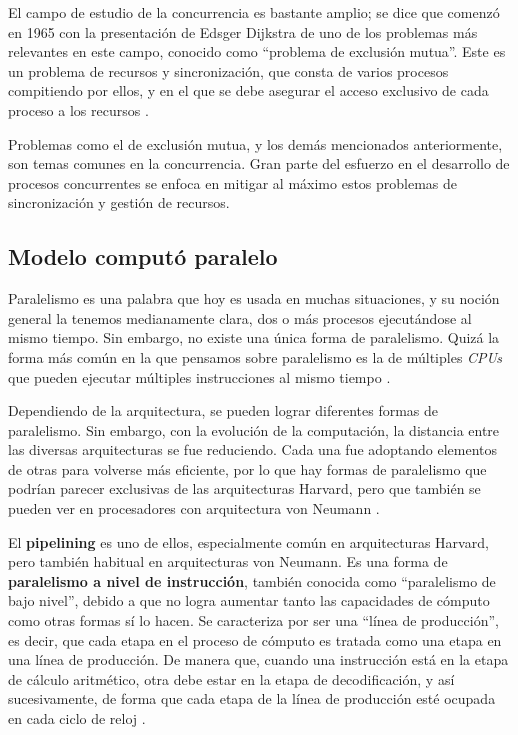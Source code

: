 \documentclass[letterpaper,12pt,oneside]{book}
\begin{document}
		El campo de estudio de la concurrencia es bastante amplio; se dice que comenzó en 1965 con la presentación de Edsger Dijkstra de uno
		de los problemas más relevantes en este campo, conocido como ``problema de exclusión mutua''. Este es un 
		problema de recursos y sincronización, que consta de varios procesos compitiendo por ellos, y en el que se debe asegurar el acceso exclusivo de
		cada proceso a los recursos \cite{gadi_taubenfeld_concurrent_nodate}. 
  
        Problemas como el de exclusión mutua, y los demás mencionados anteriormente,
		son temas comunes en la concurrencia. Gran parte del esfuerzo en el desarrollo de procesos concurrentes se enfoca en mitigar al máximo estos problemas de sincronización y gestión de recursos.
		
		
		
		\subsection{Modelo computó paralelo}

		Paralelismo es una palabra que hoy es usada en muchas situaciones, y su noción general la tenemos medianamente clara, dos o más procesos
		ejecutándose al mismo tiempo. Sin embargo, no existe una única forma de paralelismo. Quizá la forma más común en la que pensamos sobre paralelismo
		es la de múltiples \textit{CPUs} que pueden ejecutar múltiples instrucciones al mismo tiempo \cite{null_essentials_2003}.
  
        Dependiendo de la arquitectura, se pueden lograr diferentes formas de paralelismo. Sin embargo,
		con la evolución de la computación, la distancia entre las diversas arquitecturas se fue reduciendo. Cada una fue adoptando
		elementos de otras para volverse más eficiente, por lo que hay formas de paralelismo que podrían parecer exclusivas de las arquitecturas
		Harvard, pero que también se pueden ver en procesadores con arquitectura von Neumann \cite{null_essentials_2003}.
  
        El \textbf{pipelining} es uno de ellos, especialmente común en arquitecturas Harvard, pero también habitual en arquitecturas von Neumann. Es una forma de \textbf{paralelismo
		a nivel de instrucción}, también conocida como ``paralelismo de bajo nivel'', debido a que no logra aumentar tanto las capacidades
		de cómputo como otras formas sí lo hacen. Se caracteriza por ser una ``línea de producción'', es decir, que cada etapa en el proceso de cómputo es 
		tratada
		como una etapa en una línea de producción. De manera que, cuando una instrucción está en la etapa de cálculo aritmético,  otra debe estar en la etapa de decodificación, y así sucesivamente, de forma que cada etapa de la línea de producción
		esté ocupada en cada ciclo de reloj \cite[p.421]{null_essentials_2003}. 
  
\end{document}
